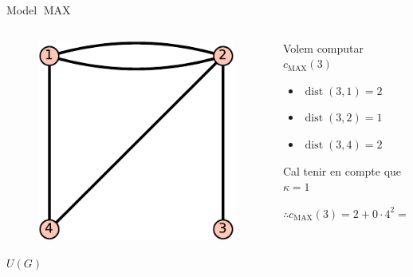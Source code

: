 \documentclass[aspectratio=169,handout]{beamer}
\DeclareMathOperator{\dist}{dist}
\DeclareMathOperator{\MAX}{MAX}
\begin{document}
\begin{frame}{Model $\MAX$}
    \begin{columns}
        \begin{column}{0.5\textwidth}
        \centering
        \begin{figure}
        \includegraphics[scale=0.75]{u-crop}
        \end{figure}
        \vspace{-1em}
        {\large $U(G)$}
        \end{column}
        
        \begin{column}{0.5\textwidth}
        Volem computar $c_{\MAX}(3)$
        
        \vspace{1em}

        \begin{itemize}
            \item[] $\dist(3,1) = 2$ 
            \item[] $\dist(3,2) = 1$
            \item[] $\dist(3,4) = 2$ 
        \end{itemize}
        
        \vspace{1em}
        
        Cal tenir en compte que $\kappa = 1$
        
        \vspace{0.5em}
        
        
        $\therefore c_{\MAX}(3) = 2 + 0 \cdot 4^2 = 2$
        \end{column}
    \end{columns}
\end{frame}
\end{document}

